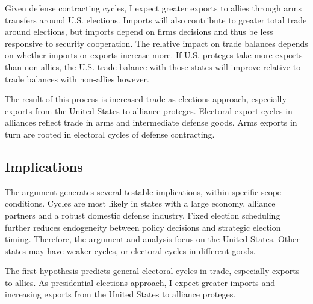 \documentclass[12pt]{article}
\begin{document}


Given defense contracting cycles, I expect greater exports to allies through arms transfers around U.S. elections.
Imports will also contribute to greater total trade around elections, but imports depend on firms decisions and thus be less responsive to security cooperation.
The relative impact on trade balances depends on whether imports or exports increase more. 
If U.S. proteges take more exports than non-allies, the U.S. trade balance with those states will improve relative to trade balances with non-allies however.


The result of this process is increased trade as elections approach, especially exports from the United States to alliance proteges.
Electoral export cycles in alliances reflect trade in arms and intermediate defense goods. 
Arms exports in turn are rooted in electoral cycles of defense contracting.



\subsection{Implications}



The argument generates several testable implications, within specific scope conditions. 
Cycles are most likely in states with a large economy, alliance partners and a robust domestic defense industry. 
Fixed election scheduling further reduces endogeneity between policy decisions and strategic election timing.
Therefore, the argument and analysis focus on the United States. 
Other states may have weaker cycles, or electoral cycles in different goods.


The first hypothesis predicts general electoral cycles in trade, especially exports to allies. 
As presidential elections approach, I expect greater imports and increasing exports from the United States to alliance proteges.
\end{document}
